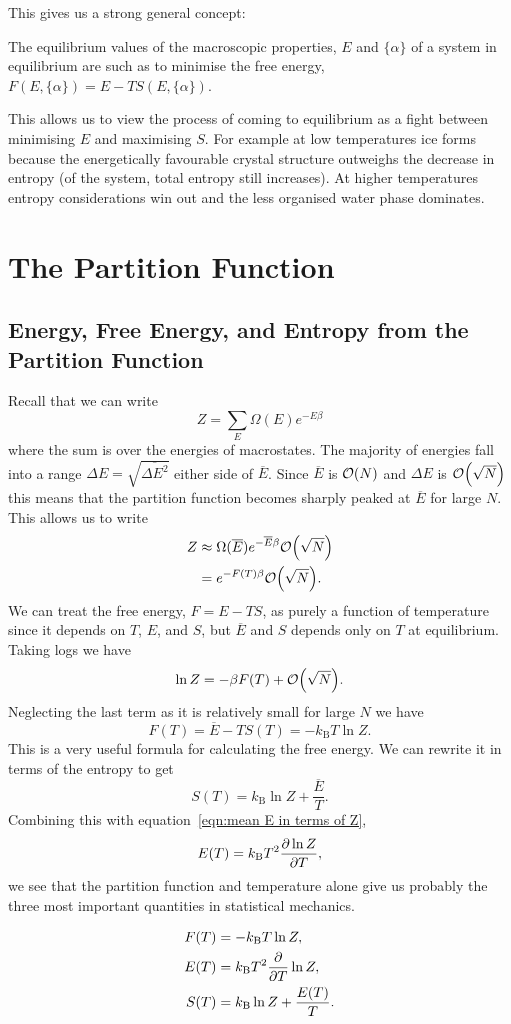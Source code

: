 \documentclass[a4paper]{article}
\newcommand{\boltzmann}{k_\mathrm{B}}
\newcommand{\mean}[1]{\overline{#1}}
\newcounter{keypointcounter}
\newenvironment{keypoint}{%
    \stepcounter{keypointcounter}
    \begin{tcolorbox}[breakable, title=Key Point \thekeypointcounter]
}{%
    \end{tcolorbox}
}
\begin{document}
    This gives us a strong general concept: 
    \begin{keypoint}
        The equilibrium values of the macroscopic properties, \(E\) and \(\{\alpha\}\) of a system in equilibrium are such as to minimise the free energy, \(F(E, \{\alpha\}) = E - TS(E, \{\alpha\})\).
    \end{keypoint}
    
    This allows us to view the process of coming to equilibrium as a fight between minimising \(E\) and maximising \(S\).
    For example at low temperatures ice forms because the energetically favourable crystal structure outweighs the decrease in entropy (of the system, total entropy still increases).
    At higher temperatures entropy considerations win out and the less organised water phase dominates.
    
    \section{The Partition Function}
    \subsection{Energy, Free Energy, and Entropy from the Partition Function}
    Recall that we can write
    \[Z = \sum_{E} \Omega(E)e^{-E\beta}\]
    where the sum is over the energies of macrostates.
    The majority of energies fall into a range \(\Delta E = \sqrt{\mean{\Delta E^2}}\) either side of \(\mean{E}\).
    Since \(\mean{E}\) is \(\order{N}\) and \(\Delta E\) is \(\order{\sqrt{N}}\) this means that the partition function becomes sharply peaked at \(\mean{E}\) for large \(N\).
    This allows us to write
    \begin{align*}
        Z &\approx \Omega(\mean{E})e^{-\mean{E}\beta} \order{\sqrt{N}}\\
        &= e^{-F(T)\beta}\order{\sqrt{N}}.
    \end{align*}
    We can treat the free energy, \(F = E - TS\), as purely a function of temperature since it depends on \(T\), \(E\), and \(S\), but \(\mean{E}\) and \(S\) depends only on \(T\) at equilibrium.
    Taking logs we have
    \[\ln Z = -\beta F(T) + \order{\sqrt{N}}.\]
    Neglecting the last term as it is relatively small for large \(N\) we have
    \[F(T) = \mean{E} - TS(T) = -\boltzmann T\ln Z.\]
    This is a very useful formula for calculating the free energy.
    We can rewrite it in terms of the entropy to get
    \[S(T) = \boltzmann \ln Z + \frac{\mean{E}}{T}.\]
    Combining this with equation~\ref{eqn:mean E in terms of Z},
    \[E(T) = \boltzmann T^2\pdv{\ln Z}{T},\]
    we see that the partition function and temperature alone give us probably the three most important quantities in statistical mechanics.
    \begin{keypoint}
        \begin{align*}
            F(T) &= -\boltzmann T\ln Z,\\
            E(T) &= \boltzmann T^2\pdv{T}\ln Z,\\
            S(T) &= \boltzmann\ln Z + \frac{E(T)}{T}.
        \end{align*}
    \end{keypoint}
    
\end{document}
